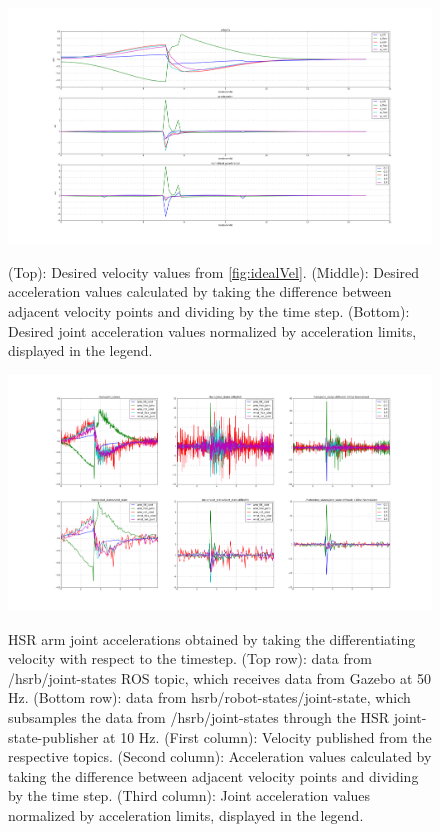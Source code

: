 \documentclass[12pt]{article}
\begin{document}
        \begin{figure}
            \centering
            \includegraphics[width=\linewidth]{2020.05.17/ideal_acc_9_6.png}
            \label{fig:accelerations_ideal}
            \caption{(Top): Desired velocity values from \cref{fig:idealVel}. (Middle): Desired acceleration values calculated by taking the difference between adjacent velocity points and dividing by the time step. (Bottom): Desired joint acceleration values normalized by acceleration limits, displayed in the legend.} 
        \end{figure}   
        \begin{figure}
            \centering
            \includegraphics[width=\linewidth]{2020.05.17/accelerations_adjusted.png}
            \label{fig:accelerations_diffed}
            \caption{
                HSR arm joint accelerations obtained by taking the differentiating velocity with respect to the timestep. (Top row): data from /hsrb/joint-states ROS topic, which receives data from Gazebo at 50 Hz. (Bottom row): data from hsrb/robot-states/joint-state, which subsamples the data from /hsrb/joint-states through the HSR joint-state-publisher at 10 Hz. (First column): Velocity published from the respective topics. (Second column): Acceleration values calculated by taking the difference between adjacent velocity points and dividing by the time step. (Third column): Joint acceleration values normalized by acceleration limits, displayed in the legend.} 
        \end{figure}
        
\end{document}
